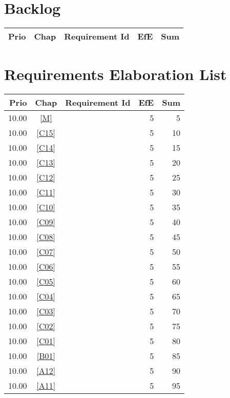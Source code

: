 \section{Backlog}
\begin{longtable}{|r|c|p{7cm}||r|r|} \hline
\textbf{Prio} & \textbf{Chap} & \textbf{Requirement Id} & \textbf{EfE} & \textbf{Sum} \\ \hline\endhead
\end{longtable}\section{Requirements Elaboration List}
\begin{longtable}{|r|c|p{7cm}||r|r|} \hline
\textbf{Prio} & \textbf{Chap} & \textbf{Requirement Id} & \textbf{EfE} & \textbf{Sum} \\ \hline\endhead
10.00 & \ref{M} & \nameref{M} & 5 & 5 \\ \hline
10.00 & \ref{C15} & \nameref{C15} & 5 & 10 \\ \hline
10.00 & \ref{C14} & \nameref{C14} & 5 & 15 \\ \hline
10.00 & \ref{C13} & \nameref{C13} & 5 & 20 \\ \hline
10.00 & \ref{C12} & \nameref{C12} & 5 & 25 \\ \hline
10.00 & \ref{C11} & \nameref{C11} & 5 & 30 \\ \hline
10.00 & \ref{C10} & \nameref{C10} & 5 & 35 \\ \hline
10.00 & \ref{C09} & \nameref{C09} & 5 & 40 \\ \hline
10.00 & \ref{C08} & \nameref{C08} & 5 & 45 \\ \hline
10.00 & \ref{C07} & \nameref{C07} & 5 & 50 \\ \hline
10.00 & \ref{C06} & \nameref{C06} & 5 & 55 \\ \hline
10.00 & \ref{C05} & \nameref{C05} & 5 & 60 \\ \hline
10.00 & \ref{C04} & \nameref{C04} & 5 & 65 \\ \hline
10.00 & \ref{C03} & \nameref{C03} & 5 & 70 \\ \hline
10.00 & \ref{C02} & \nameref{C02} & 5 & 75 \\ \hline
10.00 & \ref{C01} & \nameref{C01} & 5 & 80 \\ \hline
10.00 & \ref{B01} & \nameref{B01} & 5 & 85 \\ \hline
10.00 & \ref{A12} & \nameref{A12} & 5 & 90 \\ \hline
10.00 & \ref{A11} & \nameref{A11} & 5 & 95 \\ \hline

\end{longtable}
